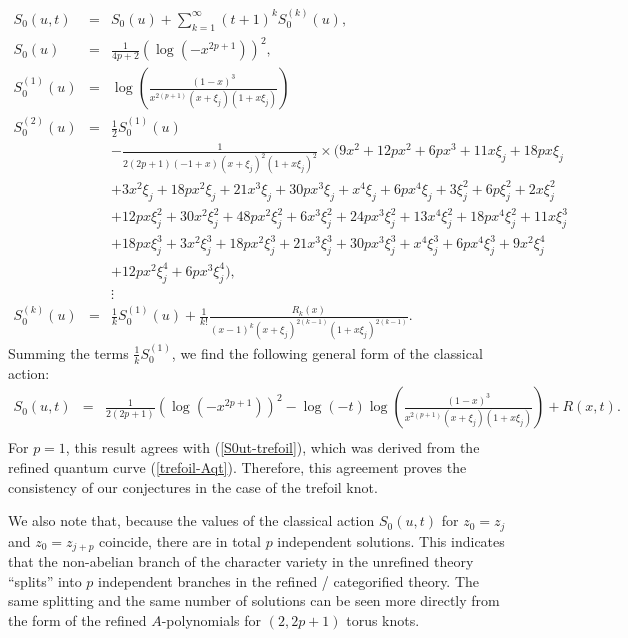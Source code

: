 \documentclass[hyper,letterpaper]{JHEP3}
\begin{document}
\begin{eqnarray}
S_0(u,t)&=&S_0(u)+\sum_{k=1}^{\infty}(t+1)^kS_0^{(k)}(u),
\nonumber \\
S_0(u)&=&\frac{1}{4p+2}\left(\log(-x^{2p+1})\right)^2,
\nonumber \\
S_0^{(1)}(u)&=&\log\left(\frac{(1-x)^3}{x^{2(p+1)}(x+\xi_j)(1+x\xi_j)}\right)
\nonumber \\
S_0^{(2)}(u)&=&\frac{1}{2}S_0^{(1)}(u)
\nonumber \\
&&-\frac{1}{2(2p+1)(-1+x)(x+\xi_j)^2(1+x\xi_j)^2}
\times (9 x^2 + 12 p x^2 + 6 p x^3 + 11 x \xi_j + 18 p x \xi_j
\nonumber \\
&&
+
 3 x^2 \xi_j + 18 p x^2 \xi_j
+ 21 x^3 \xi_j + 30 p x^3 \xi_j +
 x^4 \xi_j + 6 p x^4 \xi_j + 3 \xi_j^2 + 6 p \xi_j^2 + 2 x \xi_j^2
\nonumber \\
&&
+
 12 p x \xi_j^2 + 30 x^2 \xi_j^2 + 48 p x^2 \xi_j^2 + 6 x^3 \xi_j^2 +
 24 p x^3 \xi_j^2 + 13 x^4 \xi_j^2 + 18 p x^4 \xi_j^2 +
 11 x \xi_j^3
\nonumber \\
&&
+ 18 p x \xi_j^3 + 3 x^2 \xi_j^3
+ 18 p x^2 \xi_j^3 +
 21 x^3 \xi_j^3 + 30 p x^3 \xi_j^3 + x^4 \xi_j^3 + 6 p x^4 \xi_j^3 +
 9 x^2 \xi_j^4
\nonumber \\
&&
+ 12 p x^2 \xi_j^4 + 6 p x^3 \xi_j^4),
\nonumber \\
&&\vdots
\nonumber \\
S_0^{(k)}(u)&=&\frac{1}{k}S_0^{(1)}(u)+\frac{1}{k!}\frac{R_k(x)}{(x-1)^k(x+\xi_j)^{2(k-1)}(1+x\xi_j)^{2(k-1)}}.
\end{eqnarray}
Summing the terms $\frac{1}{k} S_0^{(1)}$, we find the following general form of the classical action:
\begin{eqnarray}
S_0(u,t)&=&\frac{1}{2(2p+1)}\left(\log(-x^{2p+1})\right)^2-\log(-t)
 \log\left(\frac{(1-x)^3}{x^{2(p+1)}(x+\xi_j)(1+x\xi_j)}\right)+R(x,t).
\nonumber \\
&&
\end{eqnarray}
For $p=1$, this result agrees with (\ref{S0ut-trefoil}),
which was derived from the refined quantum curve (\ref{trefoil-Aqt}).
Therefore, this agreement proves the consistency of our conjectures in the case of the trefoil knot.

We also note that, because the values of the classical action $S_0(u,t)$ for $z_0=z_j$ and $z_0=z_{j+p}$ coincide,
there are in total $p$ independent solutions.
This indicates that the non-abelian branch of the character variety in the unrefined theory
``splits'' into $p$ independent branches in the refined / categorified theory.
The same splitting and the same number of solutions can be seen more directly
from the form of the refined $A$-polynomials for $(2,2p+1)$ torus knots.
\end{document}
